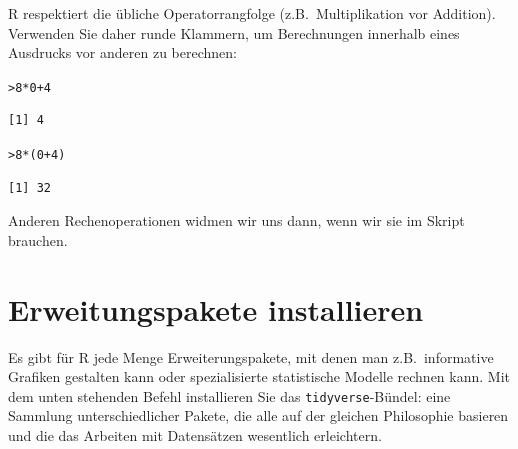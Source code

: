 \documentclass[oneside, 10pt]{book}\usepackage[]{graphicx}\usepackage[]{xcolor}
\makeatletter
\newcommand{\hlnum}[1]{\textcolor[rgb]{0.686,0.059,0.569}{#1}}%
\newcommand{\hlopt}[1]{\textcolor[rgb]{0,0,0}{#1}}%
\newcommand{\hlstd}[1]{\textcolor[rgb]{0.345,0.345,0.345}{#1}}%
\newenvironment{kframe}{%
 \def\at@end@of@kframe{}%
 \ifinner\ifhmode%
  \def\at@end@of@kframe{\end{minipage}}%
  \begin{minipage}{\columnwidth}%
 \fi\fi%
 \def\FrameCommand##1{\hskip\@totalleftmargin \hskip-\fboxsep
 \colorbox{shadecolor}{##1}\hskip-\fboxsep
     \hskip-\linewidth \hskip-\@totalleftmargin \hskip\columnwidth}%
 \MakeFramed {\advance\hsize-\width
   \@totalleftmargin\z@ \linewidth\hsize
   \@setminipage}}%
 {\par\unskip\endMakeFramed%
 \at@end@of@kframe}
\newenvironment{knitrout}{}{} %
\makeatother
\begin{document}
R respektiert die übliche Operatorrangfolge (z.B.\ Multiplikation vor Addition).
Verwenden Sie daher runde Klammern, um Berechnungen innerhalb eines Ausdrucks
vor anderen zu berechnen:

\begin{knitrout}
\color{fgcolor}\begin{kframe}
\begin{alltt}
\hlstd{> }\hlnum{8} \hlopt{*} \hlnum{0} \hlopt{+} \hlnum{4}
\end{alltt}
\begin{verbatim}
[1] 4
\end{verbatim}
\begin{alltt}
\hlstd{> }\hlnum{8} \hlopt{*} \hlstd{(}\hlnum{0} \hlopt{+} \hlnum{4}\hlstd{)}
\end{alltt}
\begin{verbatim}
[1] 32
\end{verbatim}
\end{kframe}
\end{knitrout}

Anderen Rechenoperationen widmen wir uns dann, wenn wir sie im Skript brauchen.

\section{Erweitungspakete installieren}
Es gibt für R jede Menge Erweiterungspakete,
mit denen man z.B.\ informative Grafiken
gestalten kann oder spezialisierte statistische
Modelle rechnen kann.
Mit dem unten stehenden Befehl installieren Sie das
\texttt{tidyverse}-Bündel: eine
Sammlung unterschiedlicher Pakete, die alle
auf der gleichen Philosophie basieren und 
die das Arbeiten mit Datensätzen wesentlich
erleichtern.
\end{document}
